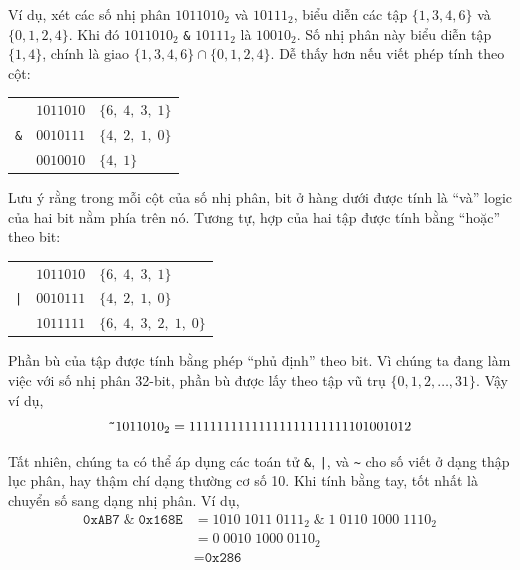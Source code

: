 Ví dụ, xét các số nhị phân $1011010_2$ và $10111_2$, biểu diễn các tập $\{1, 3, 4, 6\}$ và $\{0, 1, 2, 4\}$. Khi đó $1011010_2$ \texttt{\&} $10111_2$ là $10010_2$. Số nhị phân này biểu diễn tập $\{1, 4\}$, chính là giao $\{1, 3, 4, 6\} \cap \{0, 1, 2, 4\}$. Dễ thấy hơn nếu viết phép tính theo cột:

\begin{center}
\begin{tabular}{r@{\quad}l}
 & $1011010 \quad \{6,\; 4,\; 3,\; 1\}$ \\
\texttt{\&} & $0010111 \quad \{4,\; 2,\; 1,\; 0\}$ \\
\hline
 & $0010010 \quad \{4,\; 1\}$ \\
\end{tabular}
\end{center}

Lưu ý rằng trong mỗi cột của số nhị phân, bit ở hàng dưới được tính là ``và'' logic của hai bit nằm phía trên nó. Tương tự, hợp của hai tập được tính bằng ``hoặc'' theo bit:

\begin{center}
\begin{tabular}{r@{\quad}l}
 & $1011010 \quad \{6,\; 4,\; 3,\; 1\}$ \\
\texttt{|} & $0010111 \quad \{4,\; 2,\; 1,\; 0\}$ \\
\hline
 & $1011111 \quad \{6,\; 4,\; 3,\; 2,\; 1,\; 0\}$ \\
\end{tabular}
\end{center}

Phần bù của tập được tính bằng phép ``phủ định'' theo bit. Vì chúng ta đang làm việc với số nhị phân 32-bit, phần bù được lấy theo tập vũ trụ $\{0, 1, 2, \ldots, 31\}$. Vậy ví dụ,
\[
\texttt{\~{}}1011010_2 = 11111111111111111111111101001012
\]

Tất nhiên, chúng ta có thể áp dụng các toán tử \texttt{\&}, \texttt{|}, và \texttt{\~{}} cho số viết ở dạng thập lục phân, hay thậm chí dạng thường cơ số 10. Khi tính bằng tay, tốt nhất là chuyển số sang dạng nhị phân. Ví dụ,
\begin{align*}
\texttt{0xAB7} \;\texttt{\&}\; \texttt{0x168E} &= 1010\;1011\;0111_2 \;\texttt{\&}\; 1\;0110\;1000\;1110_2 \\
&= 0\;0010\;1000\;0110_2 \\
&= \texttt{0x286}
\end{align*}

